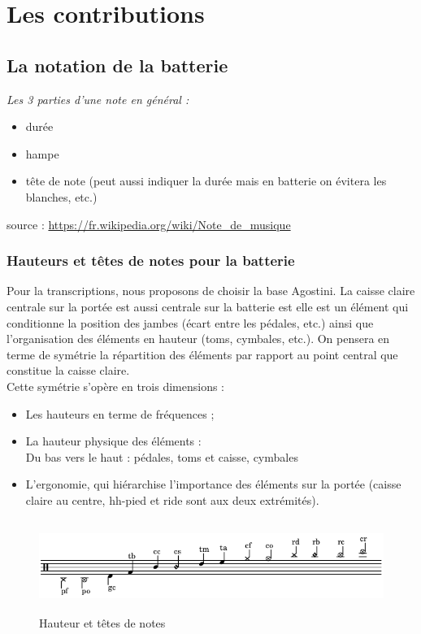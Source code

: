 \section{Les contributions}
\subsection{La notation de la batterie}
\textit{Les 3 parties d’une note en général :}
\begin{itemize}
	\item durée
	\item hampe
	\item tête de note (peut aussi indiquer la durée mais en batterie on évitera les blanches, etc.)
\end{itemize}
source : \url{https://fr.wikipedia.org/wiki/Note_de_musique}

\subsubsection{Hauteurs et têtes de notes pour la batterie}
Pour la transcriptions, nous proposons de choisir la base Agostini. La caisse claire centrale sur la portée est aussi centrale sur la batterie est elle est un élément qui conditionne la position des jambes (écart entre les pédales, etc.) ainsi que l’organisation des éléments en hauteur (toms, cymbales, etc.).
On pensera en terme de symétrie la répartition des éléments par rapport au point central que constitue la caisse claire.\\
Cette symétrie s’opère en trois dimensions :
\begin{itemize}
	\item Les hauteurs en terme de fréquences ;
	\item La hauteur physique des éléments :\\
	Du bas vers le haut : pédales, toms et caisse, cymbales
	\item L’ergonomie, qui hiérarchise l’importance des éléments sur la portée (caisse claire au centre, hh-pied et ride sont aux deux extrémités).
\end{itemize}
\begin{figure}[h]
	\includegraphics[height=30mm, width=155mm]{z_images/1_description_notation/notes.png}
	\caption{Hauteur et têtes de notes}
\end{figure}
